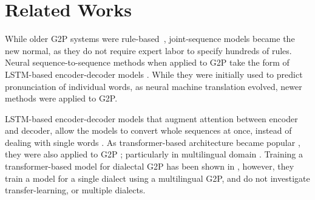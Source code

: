 \section{Related Works}
While older G2P systems were rule-based~\cite{elovitz1976automatic}, joint-sequence models \cite{BISANI2008434} became the new normal, as they do not require expert labor to specify hundreds of rules. Neural sequence-to-sequence methods when applied to G2P take the form of LSTM-based encoder-decoder models \cite{rao2015grapheme}. While they were initially used to predict pronunciation of individual words, as neural machine translation evolved, newer methods were applied to G2P.

LSTM-based encoder-decoder models that augment attention between encoder and decoder, allow the models to convert whole sequences at once, instead of dealing with single words \cite{peters2017massively}. As transformer-based architecture became popular \cite{Vaswani2017AttentionIA}, they were also applied to G2P \cite{yolchuyeva2020transformer}; particularly in multilingual domain \cite{yu2020multilingual,vesik2020model}. Training a transformer-based model for dialectal G2P has been shown in \cite{blandon2019multilingual}, however, they train a model for a single dialect using a multilingual G2P, and do not investigate transfer-learning, or multiple dialects.


